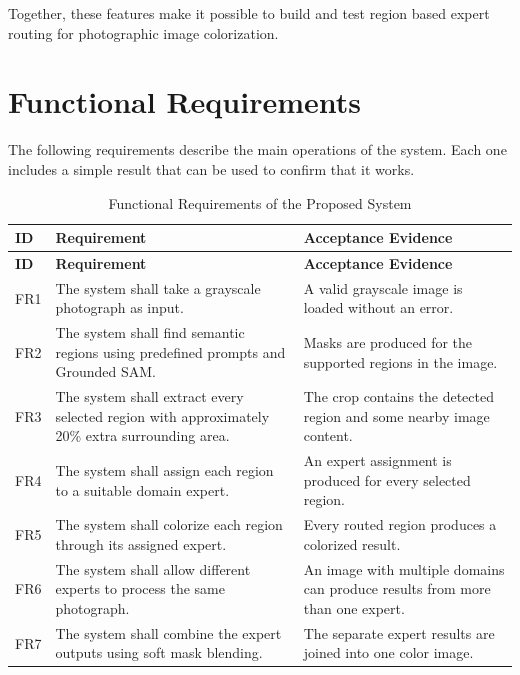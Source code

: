 \documentclass{FastFyp}
\begin{document}
Together, these features make it possible to build and test region based expert routing for photographic image colorization.

\section{Functional Requirements}

The following requirements describe the main operations of the system. Each one includes a simple result that can be used to confirm that it works.

\begin{longtable}{|p{1.2cm}|p{7.1cm}|p{6.0cm}|}
\caption{Functional Requirements of the Proposed System}
\label{tab:functional-requirements}\\
\hline
\textbf{ID} & \textbf{Requirement} & \textbf{Acceptance Evidence} \\ \hline
\endfirsthead

\hline
\textbf{ID} & \textbf{Requirement} & \textbf{Acceptance Evidence} \\ \hline
\endhead

FR1 &
The system shall take a grayscale photograph as input. &
A valid grayscale image is loaded without an error. \\ \hline

FR2 &
The system shall find semantic regions using predefined prompts and Grounded SAM. &
Masks are produced for the supported regions in the image. \\ \hline

FR3 &
The system shall extract every selected region with approximately 20\% extra surrounding area. &
The crop contains the detected region and some nearby image content. \\ \hline

FR4 &
The system shall assign each region to a suitable domain expert. &
An expert assignment is produced for every selected region. \\ \hline

FR5 &
The system shall colorize each region through its assigned expert. &
Every routed region produces a colorized result. \\ \hline

FR6 &
The system shall allow different experts to process the same photograph. &
An image with multiple domains can produce results from more than one expert. \\ \hline

FR7 &
The system shall combine the expert outputs using soft mask blending. &
The separate expert results are joined into one color image. \\ \hline


\end{longtable}
\end{document}
